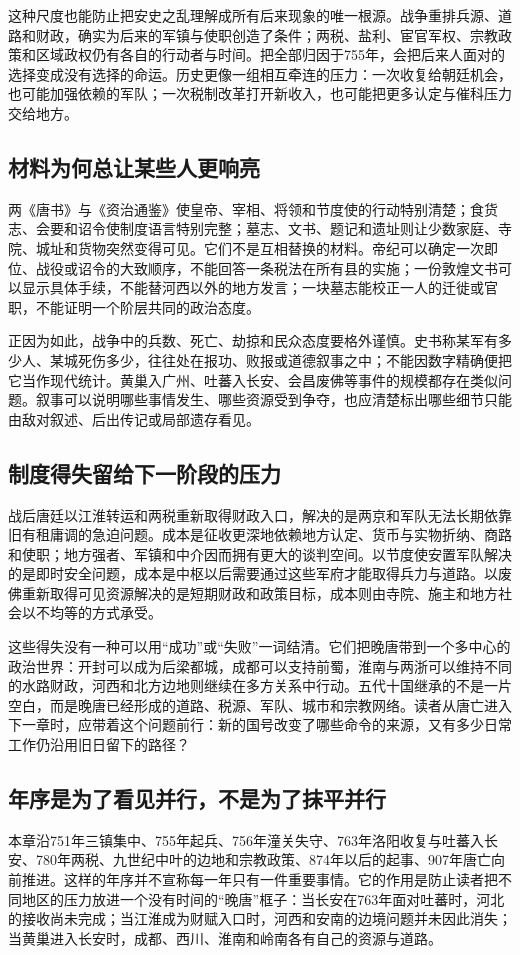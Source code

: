 这种尺度也能防止把安史之乱理解成所有后来现象的唯一根源。战争重排兵源、道路和财政，确实为后来的军镇与使职创造了条件；两税、盐利、宦官军权、宗教政策和区域政权仍有各自的行动者与时间。把全部归因于755年，会把后来人面对的选择变成没有选择的命运。历史更像一组相互牵连的压力：一次收复给朝廷机会，也可能加强依赖的军队；一次税制改革打开新收入，也可能把更多认定与催科压力交给地方。

\subsection{材料为何总让某些人更响亮}
两《唐书》与《资治通鉴》使皇帝、宰相、将领和节度使的行动特别清楚；食货志、会要和诏令使制度语言特别完整；墓志、文书、题记和遗址则让少数家庭、寺院、城址和货物突然变得可见。它们不是互相替换的材料。帝纪可以确定一次即位、战役或诏令的大致顺序，不能回答一条税法在所有县的实施；一份敦煌文书可以显示具体手续，不能替河西以外的地方发言；一块墓志能校正一人的迁徙或官职，不能证明一个阶层共同的政治态度。

正因为如此，战争中的兵数、死亡、劫掠和民众态度要格外谨慎。史书称某军有多少人、某城死伤多少，往往处在报功、败报或道德叙事之中；不能因数字精确便把它当作现代统计。黄巢入广州、吐蕃入长安、会昌废佛等事件的规模都存在类似问题。叙事可以说明哪些事情发生、哪些资源受到争夺，也应清楚标出哪些细节只能由敌对叙述、后出传记或局部遗存看见。

\subsection{制度得失留给下一阶段的压力}
战后唐廷以江淮转运和两税重新取得财政入口，解决的是两京和军队无法长期依靠旧有租庸调的急迫问题。成本是征收更深地依赖地方认定、货币与实物折纳、商路和使职；地方强者、军镇和中介因而拥有更大的谈判空间。以节度使安置军队解决的是即时安全问题，成本是中枢以后需要通过这些军府才能取得兵力与道路。以废佛重新取得可见资源解决的是短期财政和政策目标，成本则由寺院、施主和地方社会以不均等的方式承受。

这些得失没有一种可以用“成功”或“失败”一词结清。它们把晚唐带到一个多中心的政治世界：开封可以成为后梁都城，成都可以支持前蜀，淮南与两浙可以维持不同的水路财政，河西和北方边地则继续在多方关系中行动。五代十国继承的不是一片空白，而是晚唐已经形成的道路、税源、军队、城市和宗教网络。读者从唐亡进入下一章时，应带着这个问题前行：新的国号改变了哪些命令的来源，又有多少日常工作仍沿用旧日留下的路径？

\subsection{年序是为了看见并行，不是为了抹平并行}
本章沿751年三镇集中、755年起兵、756年潼关失守、763年洛阳收复与吐蕃入长安、780年两税、九世纪中叶的边地和宗教政策、874年以后的起事、907年唐亡向前推进。这样的年序并不宣称每一年只有一件重要事情。它的作用是防止读者把不同地区的压力放进一个没有时间的“晚唐”框子：当长安在763年面对吐蕃时，河北的接收尚未完成；当江淮成为财赋入口时，河西和安南的边境问题并未因此消失；当黄巢进入长安时，成都、西川、淮南和岭南各有自己的资源与道路。

